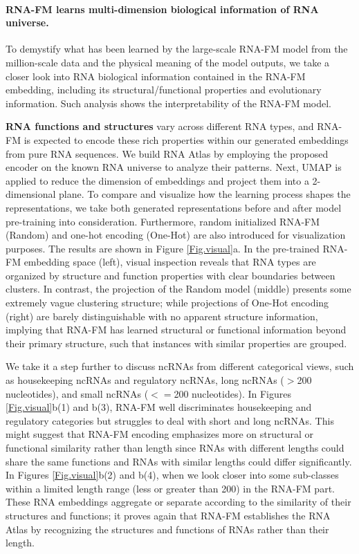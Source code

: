 \paragraph{RNA-FM learns multi-dimension biological information of RNA universe.}

To demystify what has been learned by the large-scale RNA-FM model from the million-scale data and the physical meaning of the model outputs, we take a closer look into RNA biological information contained in the RNA-FM embedding, including its structural/functional properties and evolutionary information. Such analysis shows the interpretability of the RNA-FM model.

\textbf{RNA functions and structures} vary across different RNA types, and RNA-FM is expected to encode these rich properties within our generated embeddings from pure RNA sequences. We build RNA Atlas by employing the proposed encoder on the known RNA universe to analyze their patterns. Next, UMAP \cite{mcinnes2018umap} is applied to reduce the dimension of embeddings and project them into a 2-dimensional plane. To compare and visualize how the learning process shapes the representations, we take both generated representations before and after model pre-training into consideration. Furthermore, random initialized RNA-FM (Random) and one-hot encoding (One-Hot) are also introduced for visualization purposes.
The results are shown in Figure \ref{Fig.visual}a. In the pre-trained RNA-FM embedding space (left), visual inspection reveals that RNA types are organized by structure and function properties with clear boundaries between clusters. In contrast, the projection of the Random model (middle) presents some extremely vague clustering structure; while projections of One-Hot encoding (right) are barely distinguishable with no apparent structure information, implying that RNA-FM has learned structural or functional information beyond their primary structure, such that instances with similar properties are grouped.

We take it a step further to discuss ncRNAs from different categorical views, such as housekeeping ncRNAs and regulatory ncRNAs, long ncRNAs ($>$200 nucleotides), and small ncRNAs ($<=$200 nucleotides). In Figures \ref{Fig.visual}b(1) and b(3), RNA-FM well discriminates housekeeping and regulatory categories but struggles to deal with short and long ncRNAs. This might suggest that RNA-FM encoding emphasizes more on structural or functional similarity rather than length since RNAs with different lengths could share the same functions and RNAs with similar lengths could differ significantly.
In Figures \ref{Fig.visual}b(2) and b(4), when we look closer into some sub-classes within a limited length range (less or greater than 200) in the RNA-FM part. These RNA embeddings aggregate or separate according to the similarity of their structures and functions; it proves again that RNA-FM establishes the RNA Atlas by recognizing the structures and functions of RNAs rather than their length. %

